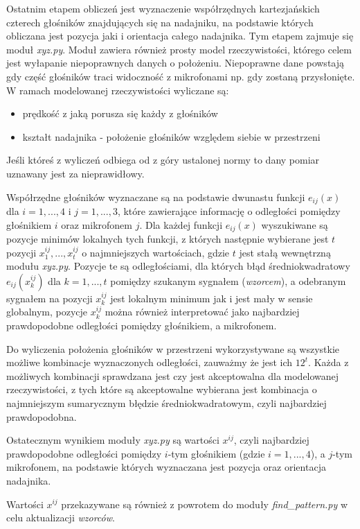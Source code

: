 Ostatnim etapem obliczeń jest wyznaczenie współrzędnych kartezjańskich czterech głośników znajdujących się na nadajniku,
na podstawie których obliczana jest pozycja jaki i orientacja całego nadajnika.
Tym etapem zajmuje się moduł \textit{xyz.py}. Moduł zawiera również prosty model rzeczywistości,
którego celem jest wyłapanie niepoprawnych danych o położeniu.
Niepoprawne dane powstają gdy część głośników traci widoczność z mikrofonami np. gdy zostaną przysłonięte.
W ramach modelowanej rzeczywistości wyliczane są:
\begin{itemize}
  \item prędkość z jaką porusza się każdy z głośników
  \item kształt nadajnika - położenie głośników względem siebie w przestrzeni
\end{itemize}
Jeśli któreś z wyliczeń odbiega od z góry ustalonej normy to dany pomiar uznawany jest za nieprawidłowy.


Współrzędne głośników wyznaczane są na podstawie dwunastu funkcji $e_{ij}(x)$ dla $i=1, ..., 4$ i $j=1, ..., 3$,
które zawierające informację o odległości pomiędzy głośnikiem $i$ oraz mikrofonem $j$.
Dla każdej funkcji $e_{ij}(x)$ wyszukiwane są pozycje minimów lokalnych tych funkcji, 
z których następnie wybierane jest $t$ pozycji $x^{ij}_1, ..., x^{ij}_t$
o najmniejszych wartościach, gdzie $t$ jest stałą wewnętrzną modułu \textit{xyz.py}.
Pozycje te są odległościami, dla których błąd średniokwadratowy
$e_{ij}(x^{ij}_k)$ dla $k=1, ..., t$ pomiędzy szukanym sygnałem (\textit{wzorcem}), a odebranym sygnałem na pozycji $x^{ij}_k$
jest lokalnym minimum jak i jest mały w sensie globalnym,
pozycje $x^{ij}_k$ można również  interpretować jako najbardziej prawdopodobne odległości pomiędzy głośnikiem, a mikrofonem.

Do wyliczenia położenia głośników w przestrzeni wykorzystywane są wszystkie możliwe kombinacje wyznaczonych odległości,
zauważmy że jest ich $12^t$. Każda z możliwych kombinacji 
sprawdzana jest czy jest akceptowalna dla modelowanej rzeczywistości, z tych które są akceptowalne wybierana jest 
kombinacja o najmniejszym sumarycznym błędzie średniokwadratowym, czyli najbardziej prawdopodobna.

Ostatecznym wynikiem  moduły \textit{xyz.py} są wartości $x^{ij}$, czyli najbardziej prawdopodobne odległości
pomiędzy  $i$-tym głośnikiem (gdzie $i=1,...,4$), a $j$-tym mikrofonem, na podstawie których 
wyznaczana jest pozycja oraz orientacja nadajnika.

Wartości $x^{ij}$ przekazywane są również z powrotem do moduły \textit{find\_pattern.py} w celu aktualizacji \textit{wzorców}.


